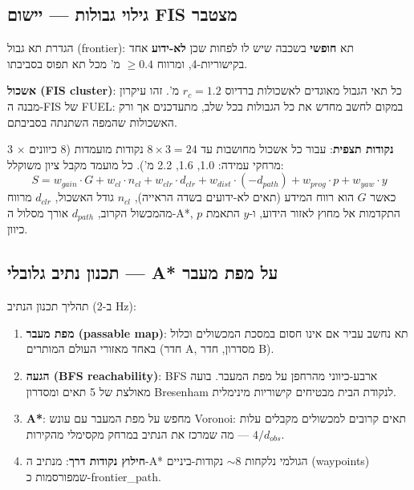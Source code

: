 \documentclass[11pt,a4paper]{article}
\begin{document}
\subsection{גילוי גבולות — יישום \textenglish{FIS} מצטבר}

הגדרת תא גבול (\textenglish{frontier}): תא \textbf{חופשי} בשכבה שיש לו לפחות שכן \textbf{לא-ידוע} אחד בקישוריות-4, ומרווח $\geq 0.4$ מ' מכל תא תפוס בסביבתו.

\textbf{אשכול (FIS cluster)}: כל תאי הגבול מאוגדים לאשכולות ברדיוס $r_c = 1.2$ מ'. זהו עיקרון מבנה ה-\textenglish{FIS} של \textenglish{FUEL}: במקום לחשב מחדש את כל הגבולות בכל שלב, מתעדכנים אך ורק האשכולות שהמפה השתנתה בסביבתם.

\textbf{נקודות תצפית}: עבור כל אשכול מחושבות עד $8 \times 3 = 24$ נקודות מועמדות (8 כיוונים $\times$ 3 מרחקי עמידה: 1.0, 1.6, 2.2 מ'). כל מועמד מקבל ציון משוקלל:
\begin{equation}
    S = w_{gain} \cdot G + w_{cl} \cdot n_{cl} + w_{clr} \cdot d_{clr} + w_{dist} \cdot (-d_{path}) + w_{prog} \cdot p + w_{yaw} \cdot y
\end{equation}
כאשר $G$ הוא רווח המידע (תאים לא-ידועים בשדה הראייה), $n_{cl}$ גודל האשכול, $d_{clr}$ מרווח מהמכשול הקרוב, $d_{path}$ אורך מסלול ה-\textenglish{A*}, $p$ התקדמות אל מחוץ לאזור הידוע, ו-$y$ התאמת כיוון.

\subsection{תכנון נתיב גלובלי — \textenglish{A*} על מפת מעבר}

תהליך תכנון הנתיב (ב-2 \textenglish{Hz}):
\begin{enumerate}
    \item \textbf{מפת מעבר (\textenglish{passable map})}: תא נחשב עביר אם אינו חסום במסכת המכשולים וכלול באחד מאזורי העולם המותרים (חדר A, מסדרון, חדר B).
    \item \textbf{הגעה (\textenglish{BFS reachability})}: \textenglish{BFS} ארבע-כיווני מהרחפן על מפת המעבר. בועה מאולצת של 5 תאים ומסדרון \textenglish{Bresenham} לנקודת הבית מבטיחים קישוריות מינימלית.
    \item \textbf{\textenglish{A*}}: מחפש על מפת המעבר עם עונש \textenglish{Voronoi}: תאים קרובים למכשולים מקבלים עלות $4 / d_{obs}$ — מה שמרכז את הנתיב במרחק מקסימלי מהקירות.
    \item \textbf{חילוץ נקודות דרך}: מנתיב ה-\textenglish{A*} הגולמי נלקחות $\sim 8$ נקודות-ביניים (\textenglish{waypoints}) שמפורסמות כ-\textenglish{frontier\_path}.
\end{enumerate}
\end{document}
